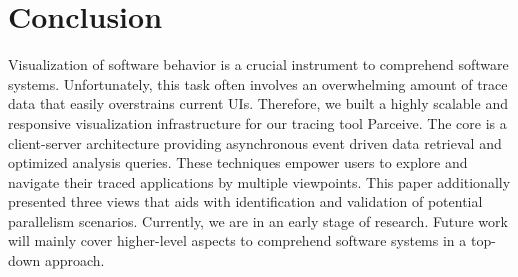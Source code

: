 \section{Conclusion}
\label{sec:conclusion}
Visualization of software behavior is a crucial instrument to comprehend
software systems. Unfortunately, this task often involves an overwhelming
amount of trace data that easily overstrains current UIs. Therefore, we built a
highly scalable and responsive visualization infrastructure for our tracing
tool Parceive. The core is a client-server architecture providing asynchronous
event driven data retrieval and optimized analysis queries. These techniques
empower users to explore and navigate their traced applications by multiple
viewpoints. This paper additionally presented three views that aids with
identification and validation of potential parallelism scenarios. Currently, we
are in an early stage of research. Future work will mainly cover higher-level
aspects to comprehend software systems in a top-down approach.